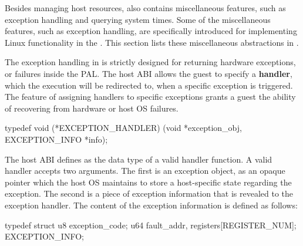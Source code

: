 \label{sec:abi:misc}


Besides managing host resources,
\thehostabi{} also contains
miscellaneous features,
such as exception handling and querying system times.
Some of the miscellaneous features,
such as exception handling,
are specifically introduced for implementing Linux functionality in the \libos{}.
This section lists these miscellaneous abstractions in \thehostabi{}.






The exception handling in \thehostabi{}
is strictly designed for returning hardware exceptions,
or failures inside the PAL.
The host ABI allows the guest to specify a {\bf handler},
which the execution will be redirected to, when a specific exception is triggered.
The feature of assigning handlers to specific exceptions
grants a guest the ability of recovering from hardware or host OS failures.




\begin{paldef}
typedef void (*EXCEPTION_HANDLER)
            (void *exception_obj, EXCEPTION_INFO *info);
\end{paldef}



The host ABI defines  as the data type of a valid handler function.
A valid handler accepts two arguments.
The first is an exception object, as an opaque pointer
which the host OS maintains to store a host-specific state regarding the exception.
The second is a piece of exception information that
is revealed to the exception handler.
The content of the exception information is defined as follows:

\begin{paldef}
typedef struct {
    u8  exception_code;
    u64 fault_addr, registers[REGISTER_NUM];
} EXCEPTION_INFO;
\end{paldef}

